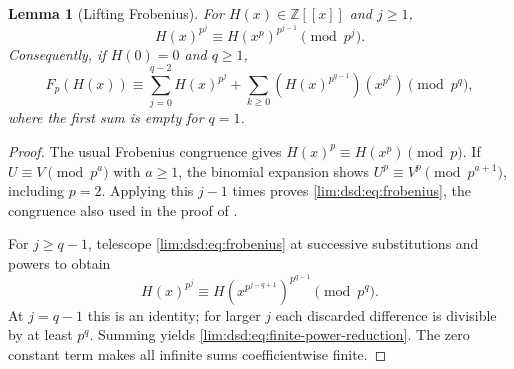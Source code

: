 \documentclass[11pt]{article}
\newtheorem{lemma}[theorem]{Lemma}
\theoremstyle{definition}
\theoremstyle{remark}
\newcommand{\Z}{\mathbb Z}
\begin{document}
\begin{lemma}[Lifting Frobenius]
\label{lim:dsd:lem:frobenius}
For $H(x)\in\Z[[x]]$ and $j\ge1$,
\begin{equation}
 H(x)^{p^j}\equiv H(x^p)^{p^{j-1}}\pmod{p^j}.
 \label{lim:dsd:eq:frobenius}
\end{equation}
Consequently, if $H(0)=0$ and $q\ge1$,
\begin{equation}
 F_p(H(x))\equiv
 \sum_{j=0}^{q-2}H(x)^{p^j}
 +\sum_{k\ge0}\left(H(x)^{p^{q-1}}\right)(x^{p^k})
 \pmod{p^q},
 \label{lim:dsd:eq:finite-power-reduction}
\end{equation}
where the first sum is empty for $q=1$.
\end{lemma}
\begin{proof}
The usual Frobenius congruence gives $H(x)^p\equiv H(x^p)\pmod p$.
If $U\equiv V\pmod{p^a}$ with $a\ge1$, the binomial expansion
shows $U^p\equiv V^p\pmod{p^{a+1}}$, including $p=2$.
Applying this $j-1$ times proves \eqref{lim:dsd:eq:frobenius}, the
congruence also used in the proof of \cite[Proposition 1.9]{dsdRY}.

For $j\ge q-1$, telescope \eqref{lim:dsd:eq:frobenius} at successive
substitutions and powers to obtain
\[
 H(x)^{p^j}\equiv
 H(x^{p^{j-q+1}})^{p^{q-1}}\pmod{p^q}.
\]
At $j=q-1$ this is an identity; for larger $j$ each discarded
difference is divisible by at least $p^q$. Summing yields
\eqref{lim:dsd:eq:finite-power-reduction}. The zero constant term makes
all infinite sums coefficientwise finite.
\end{proof}
\end{document}
